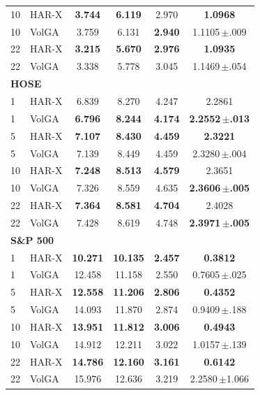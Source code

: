 \begin{tabular}{llcccc}
10 & HAR-X & \textbf{3.744} & \textbf{6.119} & 2.970 & \textbf{1.0968} \\
10 & VolGA & 3.759 & 6.131 & \textbf{2.940} & 1.1105\,$\pm$.009 \\
22 & HAR-X & \textbf{3.215} & \textbf{5.670} & \textbf{2.976} & \textbf{1.0935} \\
22 & VolGA & 3.338 & 5.778 & 3.045 & 1.1469\,$\pm$.054 \\
\midrule
\multicolumn{6}{l}{\textbf{HOSE}} \\
1 & HAR-X & 6.839 & 8.270 & 4.247 & 2.2861 \\
1 & VolGA & \textbf{6.796} & \textbf{8.244} & \textbf{4.174} & \textbf{2.2552\,$\pm$.013} \\
5 & HAR-X & \textbf{7.107} & \textbf{8.430} & \textbf{4.459} & \textbf{2.3221} \\
5 & VolGA & 7.139 & 8.449 & 4.459 & 2.3280\,$\pm$.004 \\
10 & HAR-X & \textbf{7.248} & \textbf{8.513} & \textbf{4.579} & 2.3651 \\
10 & VolGA & 7.326 & 8.559 & 4.635 & \textbf{2.3606\,$\pm$.005} \\
22 & HAR-X & \textbf{7.364} & \textbf{8.581} & \textbf{4.704} & 2.4028 \\
22 & VolGA & 7.428 & 8.619 & 4.748 & \textbf{2.3971\,$\pm$.005} \\
\midrule
\multicolumn{6}{l}{\textbf{S\&P 500}} \\
1 & HAR-X & \textbf{10.271} & \textbf{10.135} & \textbf{2.457} & \textbf{0.3812} \\
1 & VolGA & 12.458 & 11.158 & 2.550 & 0.7605\,$\pm$.025 \\
5 & HAR-X & \textbf{12.558} & \textbf{11.206} & \textbf{2.806} & \textbf{0.4352} \\
5 & VolGA & 14.093 & 11.870 & 2.874 & 0.9409\,$\pm$.188 \\
10 & HAR-X & \textbf{13.951} & \textbf{11.812} & \textbf{3.006} & \textbf{0.4943} \\
10 & VolGA & 14.912 & 12.211 & 3.022 & 1.0157\,$\pm$.139 \\
22 & HAR-X & \textbf{14.786} & \textbf{12.160} & \textbf{3.161} & \textbf{0.6142} \\
22 & VolGA & 15.976 & 12.636 & 3.219 & 2.2580\,$\pm$1.066 \\
\bottomrule
\end{tabular}
